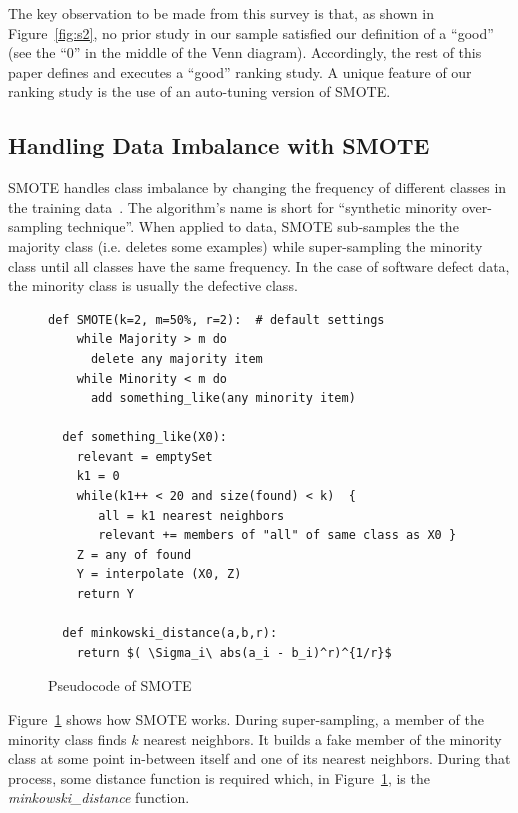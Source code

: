 \documentclass[10pt,conference]{IEEEtran}
\theoremstyle{break}
\theoremstyle{break}
\begin{document}
The key   observation to be made from  this 
survey is that, as shown in Figure~\ref{fig:s2}, no prior study in our sample satisfied  our definition of a ``good'' (see the ``0'' in the middle of the Venn diagram).
Accordingly, the rest of this
paper defines and executes a ``good'' ranking  study. A unique feature of our
ranking study is the use of an auto-tuning version of SMOTE.
 
 
\subsection{Handling Data Imbalance with SMOTE}
\label{sect:smote}

SMOTE handles class imbalance by changing the frequency of different classes in the training
data~\cite{chawla2002smote}. 
The algorithm's name is short for ``synthetic minority over-sampling technique''.
When applied to data, SMOTE sub-samples the 
the majority class (i.e. deletes some examples)
while super-sampling the minority class
until
all classes have the same frequency.  In the case of software defect data,
the minority class is usually the  defective class.



\begin{figure}[!htbp]
\scriptsize
\begin{lstlisting}[mathescape,linewidth=8.2cm,frame=r,numbers=right]
  def SMOTE(k=2, m=50%, r=2):  # default settings
    while Majority > m do
      delete any majority item
    while Minority < m do
      add something_like(any minority item)
      
  def something_like(X0): 
    relevant = emptySet
    k1 = 0
    while(k1++ < 20 and size(found) < k)  {
       all = k1 nearest neighbors
       relevant += members of "all" of same class as X0 }
    Z = any of found
    Y = interpolate (X0, Z)
    return Y
    
  def minkowski_distance(a,b,r): 
    return $( \Sigma_i\ abs(a_i - b_i)^r)^{1/r}$
\end{lstlisting}
\caption{Pseudocode of SMOTE}
\label{fig:pseudocode}  
\end{figure}



Figure~\ref{fig:pseudocode} shows how SMOTE works. During super-sampling,
a member of the minority class finds $k$ nearest neighbors. It builds a fake member
of the minority class at some point in-between itself and one of its nearest
neighbors.  During that process, some distance function is required which, in Figure~\ref{fig:pseudocode}, is the {\em minkowski\_distance} function. 
\end{document}

